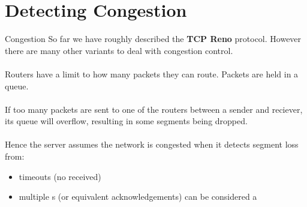 \section{Detecting Congestion}
\begin{definitionbox}{Congestion}
    So far we have roughly described the \textbf{TCP Reno} protocol. However there are many other variants to deal with congestion control.
    \\
    \\ Routers have a limit to how many packets they can route. Packets are held in a queue.
    \\
    \\ If too many packets are sent to one of the routers between a sender and reciever, its queue will overflow, resulting in some segments being dropped.
    \\
    \\ Hence the server assumes the network is congested when it detects segment loss from:
    \begin{itemize}
        \setlength\itemsep{0em}
        \item timeouts (no  received)
        \item multiple s (or equivalent acknowledgements) can be considered a 
    \end{itemize}
\end{definitionbox}

